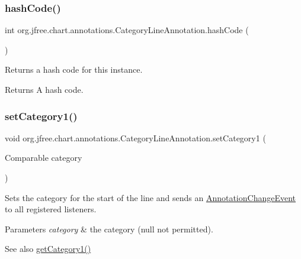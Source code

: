 \subsubsection{\texorpdfstring{hash\+Code()}{hashCode()}}
{\footnotesize\ttfamily int org.\+jfree.\+chart.\+annotations.\+Category\+Line\+Annotation.\+hash\+Code (\begin{DoxyParamCaption}{ }\end{DoxyParamCaption})}

Returns a hash code for this instance.

\begin{DoxyReturn}{Returns}
A hash code. 
\end{DoxyReturn}
\mbox{\label{classorg_1_1jfree_1_1chart_1_1annotations_1_1_category_line_annotation_a938e3f8962167a40fa217f1c9ede6bee}} 
\subsubsection{\texorpdfstring{set\+Category1()}{setCategory1()}}
{\footnotesize\ttfamily void org.\+jfree.\+chart.\+annotations.\+Category\+Line\+Annotation.\+set\+Category1 (\begin{DoxyParamCaption}\item[{Comparable}]{category }\end{DoxyParamCaption})}

Sets the category for the start of the line and sends an \mbox{\hyperlink{}{Annotation\+Change\+Event}} to all registered listeners.


\begin{DoxyParams}{Parameters}
{\em category} & the category ({\ttfamily null} not permitted).\\
\hline
\end{DoxyParams}
\begin{DoxySeeAlso}{See also}
\mbox{\hyperlink{classorg_1_1jfree_1_1chart_1_1annotations_1_1_category_line_annotation_a56d50318c866e40566dacf0d2f0e9ef2}{get\+Category1()}} 
\end{DoxySeeAlso}
\mbox{\label{classorg_1_1jfree_1_1chart_1_1annotations_1_1_category_line_annotation_a49f3bccd488d3de9cd343be3057d6da9}} 

